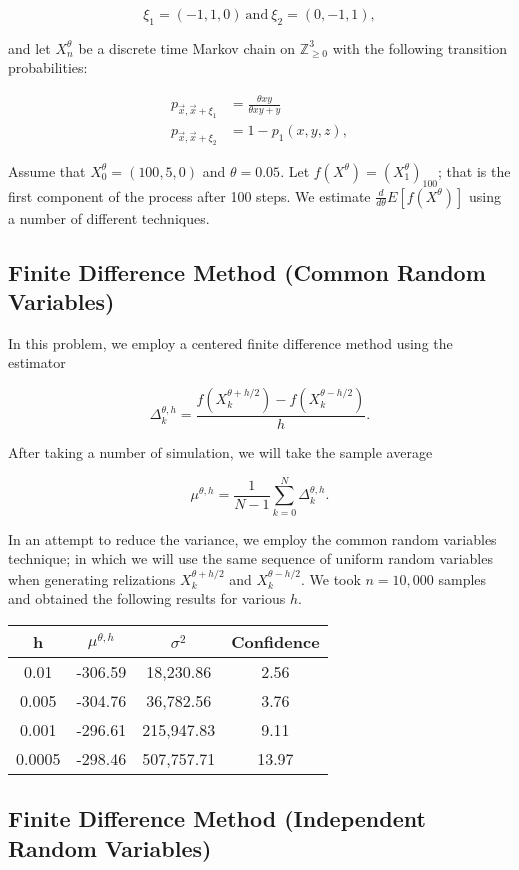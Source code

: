 \[
\xi_1 = (-1, 1, 0) \ \text{and}\ \xi_2 = (0, -1, 1),
\]

and let \(X^\theta_n\) be a discrete time Markov chain on
\(\mathbb{Z}^3_{\geq 0}\) with the following transition probabilities:

\begin{align}
p_{\vec x, \vec x + \xi_1} &= \frac{\theta xy}{\theta xy + y} \\
p_{\vec x, \vec x + \xi_2} &= 1 - p_1(x,y,z),
\end{align}

Assume that \(X^\theta_0 = (100, 5, 0)\) and \(\theta = 0.05\). Let
\(f(X^\theta) = \left(X^\theta_1\right)_{100}\); that is the first
component of the process after 100 steps. We estimate
\(\frac{d}{d\theta} E\left[f(X^\theta)\right]\) using a number of
different techniques.

\subsection{Finite Difference Method (Common Random
Variables)}\label{finite-difference-method-common-random-variables}

In this problem, we employ a centered finite difference method using the
estimator

\[
\Delta^{\theta, h}_k
      = \frac{f(X^{\theta + h/2}_k) - f(X^{\theta - h/2}_k)}{h}.
\]

After taking a number of simulation, we will take the sample average

\[
\mu^{\theta, h} = \frac{1}{N-1} \sum_{k=0}^{N} \Delta^{\theta, h}_k.
\]

In an attempt to reduce the variance, we employ the common random
variables technique; in which we will use the same sequence of uniform
random variables when generating relizations \(X^{\theta + h/2}_k\) and
\(X^{\theta - h/2}_k\). We took \(n = 10,000\) samples and obtained the
following results for various \(h\).

\begin{longtable}[]{@{}cccc@{}}
\toprule
h & \(\mu^{\theta, h}\) & \(\sigma^2\) & Confidence\tabularnewline
\midrule
\endhead
0.01 & -306.59 & 18,230.86 & 2.56\tabularnewline
0.005 & -304.76 & 36,782.56 & 3.76\tabularnewline
0.001 & -296.61 & 215,947.83 & 9.11\tabularnewline
0.0005 & -298.46 & 507,757.71 & 13.97\tabularnewline
\bottomrule
\end{longtable}

\subsection{Finite Difference Method (Independent Random
Variables)}\label{finite-difference-method-independent-random-variables}

